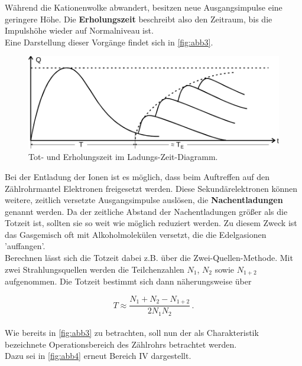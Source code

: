 Während die Kationenwolke abwandert, 
besitzen neue Ausgangsimpulse eine 
geringere Höhe.
Die \textbf{Erholungszeit} beschreibt also
den Zeitraum, bis die Impulshöhe wieder auf
Normalniveau ist.\\

Eine Darstellung dieser Vorgänge findet sich in
\autoref{fig:abb3}.

\begin{figure}[H]
    \centering
    \includegraphics{figures/Abb_3.pdf}
    \caption{Tot- und Erholungszeit im Ladungs-Zeit-Diagramm\cite{ap03}.}
    \label{fig:abb3}
\end{figure}

Bei der Entladung der Ionen ist es möglich,
dass beim Auftreffen auf den Zählrohrmantel
Elektronen freigesetzt werden.
Diese Sekundärelektronen können weitere,
zeitlich versetzte Ausgangsimpulse auslösen,
die \textbf{Nachentladungen} genannt werden.
Da der zeitliche Abstand der Nachentladungen
größer als die Totzeit ist, sollten sie so weit
wie möglich reduziert werden.
Zu diesem Zweck ist das Gasgemisch oft mit
Alkoholmolekülen versetzt, die die Edelgasionen
'auffangen'. \\

Berechnen lässt sich die Totzeit dabei z.B. über die Zwei-Quellen-Methode.
Mit zwei Strahlungsquellen werden die Teilchenzahlen $N_1$, $N_2$ sowie $N_{1 + 2}$ aufgenommen.
Die Totzeit bestimmt sich dann näherungsweise über

\begin{equation}
    T \approx \frac{N_1 + N_2 - N_{1 + 2}}{2 N_1 N_2} \,.
    \label{eq:totzeit}
\end{equation} \\

Wie bereits in \autoref{fig:abb3} zu betrachten,
soll nun der als Charakteristik bezeichnete
Operationsbereich des Zählrohrs betrachtet werden. \\

Dazu sei in \autoref{fig:abb4} erneut Bereich IV dargestellt.

